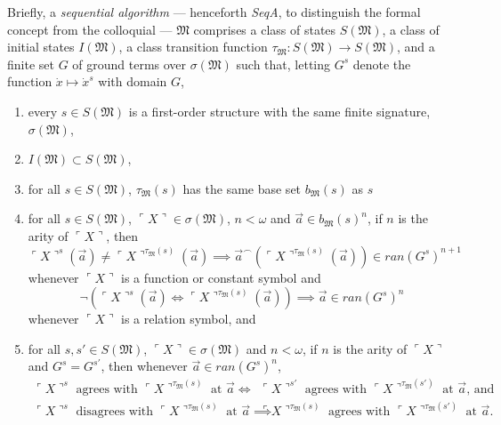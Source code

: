 \documentclass[12pt]{article}
\numberwithin{equation}{section}
\begin{document}
Briefly, a \emph{sequential algorithm} --- henceforth \textit{SeqA}, to distinguish the formal concept from the colloquial --- $\mathfrak{M}$ comprises a class of states $S(\mathfrak{M})$, a class of initial states $I(\mathfrak{M})$, a class transition function $\tau_{\mathfrak{M}} : S(\mathfrak{M}) \longrightarrow S(\mathfrak{M})$, and a finite set $G$ of ground terms over $\sigma(\mathfrak{M})$ such that, letting $G^s$ denote the function $\dot{x} \mapsto \dot{x}^s$ with domain $G$,
\begin{enumerate}[label=(A\arabic*)]
    \item\label{a1} every $s \in S(\mathfrak{M})$ is a first-order structure with the same finite signature, $\sigma(\mathfrak{M})$,
    \item\label{a2} $I(\mathfrak{M}) \subset S(\mathfrak{M})$,
    \item\label{a3'} for all $s \in S(\mathfrak{M})$, $\tau_{\mathfrak{M}}(s)$ has the same base set $b_{\mathfrak{M}}(s)$ as $s$
    \item\label{a3} for all $s \in S(\mathfrak{M})$, $\ulcorner X \urcorner \in \sigma(\mathfrak{M})$, $n < \omega$ and $\Vec{a} \in b_{\mathfrak{M}}(s)^n$, if $n$ is the arity of $\ulcorner X \urcorner$, then
    \begin{equation*}
        \ulcorner X \urcorner^s(\Vec{a}) \neq \ulcorner X \urcorner^{\tau_{\mathfrak{M}}(s)}(\Vec{a}) \implies \Vec{a}^\frown(\ulcorner X \urcorner^{\tau_{\mathfrak{M}}(s)}(\Vec{a})) \in ran(G^s)^{n+1}
    \end{equation*}
    whenever $\ulcorner X \urcorner$ is a function or constant symbol and
    \begin{equation*}
        \neg (\ulcorner X \urcorner^s(\Vec{a}) \iff \ulcorner X \urcorner^{\tau_{\mathfrak{M}}(s)}(\Vec{a})) \implies \Vec{a} \in ran(G^s)^n
    \end{equation*}
    whenever $\ulcorner X \urcorner$ is a relation symbol, and
    \item\label{a4} for all $s, s' \in S(\mathfrak{M})$, $\ulcorner X \urcorner \in \sigma(\mathfrak{M})$ and $n < \omega$, if $n$ is the arity of $\ulcorner X \urcorner$ and $G^s = G^{s'}$, then whenever $\Vec{a} \in ran(G^s)^n$,
    \begin{align*}
        \ulcorner X \urcorner^{s} \text{ agrees with } \ulcorner X \urcorner^{\tau_{\mathfrak{M}}(s)} \text{ at } \Vec{a} \iff \ & \ulcorner X \urcorner^{s'} \text{ agrees with } \ulcorner X \urcorner^{\tau_{\mathfrak{M}}(s')} \text{ at } \Vec{a} \text{, and} \\
        \ulcorner X \urcorner^{s} \text{ disagrees with } \ulcorner X \urcorner^{\tau_{\mathfrak{M}}(s)} \text{ at } \Vec{a} \implies \ & \ulcorner X \urcorner^{\tau_{\mathfrak{M}}(s)} \text{ agrees with } \ulcorner X \urcorner^{\tau_{\mathfrak{M}}(s')} \text{ at } \Vec{a} \text{.}
    \end{align*}
\end{enumerate}
\end{document}
